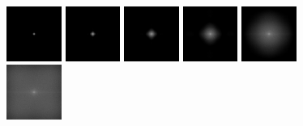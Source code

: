 \begin{figure}[!h]
\includegraphics[width=0.16\textwidth]{img/ch6/dirty/gfft1.png}
\includegraphics[width=0.16\textwidth]{img/ch6/dirty/gfft2.png}
\includegraphics[width=0.16\textwidth]{img/ch6/dirty/gfft3.png}
\includegraphics[width=0.16\textwidth]{img/ch6/dirty/gfft4.png}
\includegraphics[width=0.16\textwidth]{img/ch6/dirty/gfft5.png}
\includegraphics[width=0.16\textwidth]{img/ch6/dirty/gfft6.png}


\end{figure}
